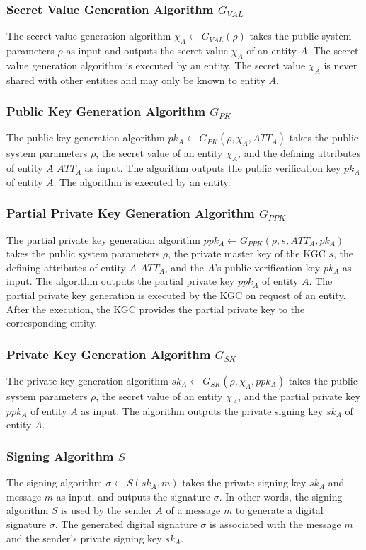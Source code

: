 \subsubsection{Secret Value Generation Algorithm $G_{VAL}$}
The secret value generation algorithm $\chi_A \leftarrow G_{VAL}(\rho)$ takes the public system parameters $\rho$ as input and outputs the secret value $\chi_A$ of an entity $A$.
The secret value generation algorithm is executed by an entity.
The secret value $\chi_A$ is never shared with other entities and may only be known to entity $A$.

\subsubsection{Public Key Generation Algorithm $G_{PK}$}
The public key generation algorithm $pk_A \leftarrow G_{PK}(\rho, \chi_A, ATT_A)$ takes the public system parameters $\rho$, the secret value of an entity $\chi_A$, and the defining attributes of entity $A$ $ATT_A$ as input.
The algorithm outputs the public verification key $pk_A$ of entity $A$.
The algorithm is executed by an entity.

\subsubsection{Partial Private Key Generation Algorithm $G_{PPK}$}
The partial private key generation algorithm $ppk_A \leftarrow G_{PPK}(\rho, s, ATT_A, pk_A)$ takes the public system parameters $\rho$, the private master key of the KGC $s$, the defining attributes of entity $A$ $ATT_A$, and the $A$'s public verification key $pk_A$ as input.
The algorithm outputs the partial private key $ppk_A$ of entity $A$.
The partial private key generation is executed by the KGC on request of an entity.
After the execution, the KGC provides the partial private key to the corresponding entity.

\subsubsection{Private Key Generation Algorithm $G_{SK}$}
The private key generation algorithm $sk_A \leftarrow G_{SK}(\rho, \chi_A, ppk_A)$ takes the public system parameters $\rho$, the secret value of an entity $\chi_A$, and the partial private key $ppk_A$ of entity $A$ as input.
The algorithm outputs the private signing key $sk_A$ of entity $A$.

\subsubsection{Signing Algorithm $S$}
The signing algorithm $\sigma \leftarrow S(sk_A, m)$ takes the private signing key $sk_A$ and message $m$ as input, and outputs the signature $\sigma$.
In other words, the signing algorithm $S$ is used by the sender $A$ of a message $m$ to generate a digital signature $\sigma$.
The generated digital signature $\sigma$ is associated with the message $m$ and the sender's private signing key $sk_A$.

